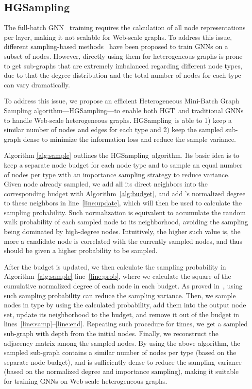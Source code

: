 \documentclass[sigconf]{acmart}
\theoremstyle{definition}
\newcommand{\short}{HGT}
\newcommand{\sampling}{HGSampling}
\begin{document}
\subsection{\sampling}

The full-batch GNN~\cite{gcn} training requires the calculation of all node representations per layer, 
making it not scalable for Web-scale graphs. 
To address this issue, different sampling-based methods~\cite{graphsage,fastgcn,DBLP:conf/icml/ChenZS18,ladies} have been proposed to train GNNs on a subset of nodes. 
However, directly using them for heterogeneous graphs is prone to get sub-graphs that are extremely imbalanced regarding different node types, due to that the degree distribution and the total number of nodes for each type can vary dramatically. 

To address this issue, we propose an efficient Heterogeneous Mini-Batch Graph Sampling algorithm---\sampling---to enable both \short\ and traditional GNNs to handle Web-scale heterogeneous graphs. 
\sampling\ is able to 1) keep a similar number of nodes and edges for each type and 2) keep the sampled sub-graph dense to minimize the information loss and reduce the sample variance. 


Algorithm \ref{alg:sample} outlines the \sampling\ algorithm. 
Its basic idea is to keep a separate node budget  for each node type  and to sample an equal number of nodes per type with an importance sampling strategy to reduce variance. 
Given node  already sampled, we add all its direct neighbors into the corresponding budget with Algorithm~\ref{alg:budget}, and add 's normalized degree to these neighbors in line~\ref{line:update}, which will then be used to calculate the sampling probability. 
Such normalization is equivalent to accumulate the random walk probability of each sampled node to its neighborhood, avoiding the sampling being dominated by high-degree nodes. 
Intuitively, the higher such value is, the more a candidate node is correlated with the currently sampled nodes, and thus should be given a higher probability to be sampled.

After the budget is updated, we then calculate the sampling probability in Algorithm~\ref{alg:sample} line~\ref{line:prob}, where we calculate the square of the cumulative normalized degree of each node  in each budget. 
As proved in~\cite{ladies}, using such sampling probability can reduce the sampling variance. Then, we sample  nodes in  type  by using the calculated probability, add them into the output node set, update its neighborhood to the budget, and remove it out of the budget in lines~\ref{line:samp}--\ref{line:end}. 
Repeating such procedure for  times, we get a sampled sub-graph with  depth from the initial nodes. Finally, we reconstruct the adjacency matrix among the sampled nodes. 
By using the above algorithm, the sampled sub-graph contains a similar number of nodes per  type (based on the separate node budget), and is sufficiently dense to reduce the sampling variance (based on the normalized degree and importance sampling), making it suitable for training GNNs on Web-scale heterogeneous graphs.
\end{document}
